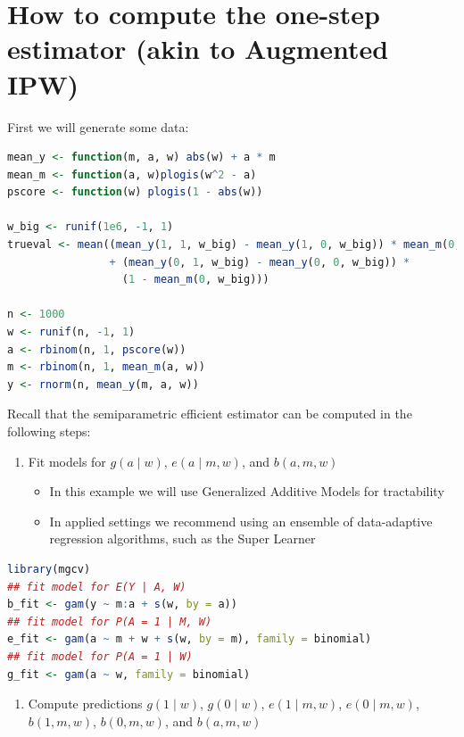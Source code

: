 \documentclass[
  12pt,
]{book}
\providecommand{\tightlist}{%
  \setlength{\itemsep}{0pt}\setlength{\parskip}{0pt}}
\theoremstyle{definition}
\theoremstyle{definition}
\theoremstyle{definition}
\newcommand{\1}{\mathbbm{1}}
\begin{document}
\hypertarget{how-to-compute-the-one-step-estimator-akin-to-augmented-ipw}{%
\section{How to compute the one-step estimator (akin to Augmented IPW)}\label{how-to-compute-the-one-step-estimator-akin-to-augmented-ipw}}

First we will generate some data:

\begin{lstlisting}[language=R]
mean_y <- function(m, a, w) abs(w) + a * m
mean_m <- function(a, w)plogis(w^2 - a)
pscore <- function(w) plogis(1 - abs(w))

w_big <- runif(1e6, -1, 1)
trueval <- mean((mean_y(1, 1, w_big) - mean_y(1, 0, w_big)) * mean_m(0, w_big)
                + (mean_y(0, 1, w_big) - mean_y(0, 0, w_big)) *
                  (1 - mean_m(0, w_big)))

n <- 1000
w <- runif(n, -1, 1)
a <- rbinom(n, 1, pscore(w))
m <- rbinom(n, 1, mean_m(a, w))
y <- rnorm(n, mean_y(m, a, w))
\end{lstlisting}

Recall that the semiparametric efficient estimator can be computed in the
following steps:

\begin{enumerate}
\def\labelenumi{\arabic{enumi}.}
\tightlist
\item
  Fit models for \(g(a\mid w)\), \(e(a\mid m, w)\), and \(b(a, m, w)\)

  \begin{itemize}
  \tightlist
  \item
    In this example we will use Generalized Additive Models for tractability
  \item
    In applied settings we recommend using an ensemble of data-adaptive
    regression algorithms, such as the Super Learner \citep{vdl2007super}
  \end{itemize}
\end{enumerate}

\begin{lstlisting}[language=R]
library(mgcv)
## fit model for E(Y | A, W)
b_fit <- gam(y ~ m:a + s(w, by = a))
## fit model for P(A = 1 | M, W)
e_fit <- gam(a ~ m + w + s(w, by = m), family = binomial)
## fit model for P(A = 1 | W)
g_fit <- gam(a ~ w, family = binomial)
\end{lstlisting}

\begin{enumerate}
\def\labelenumi{\arabic{enumi}.}
\setcounter{enumi}{1}
\tightlist
\item
  Compute predictions \(g(1\mid w)\), \(g(0\mid w)\), \(e(1\mid m, w)\),
  \(e(0\mid m, w)\),\(b(1, m, w)\), \(b(0, m, w)\), and \(b(a, m, w)\)
\end{enumerate}
\end{document}
